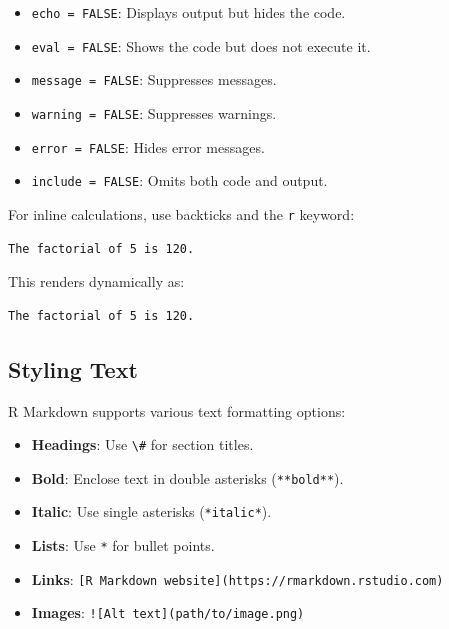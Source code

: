 \documentclass[
  11pt,
]{book}
\newcommand{\passthrough}[1]{#1}
\providecommand{\tightlist}{%
  \setlength{\itemsep}{0pt}\setlength{\parskip}{0pt}}
\theoremstyle{definition}
\theoremstyle{definition}
\theoremstyle{definition}
\theoremstyle{definition}
\theoremstyle{remark}
\begin{document}
\begin{itemize}
\tightlist
\item
  \passthrough{\lstinline!echo = FALSE!}: Displays output but hides the code.\\
\item
  \passthrough{\lstinline!eval = FALSE!}: Shows the code but does not execute it.\\
\item
  \passthrough{\lstinline!message = FALSE!}: Suppresses messages.\\
\item
  \passthrough{\lstinline!warning = FALSE!}: Suppresses warnings.\\
\item
  \passthrough{\lstinline!error = FALSE!}: Hides error messages.\\
\item
  \passthrough{\lstinline!include = FALSE!}: Omits both code and output.
\end{itemize}

For inline calculations, use backticks and the \passthrough{\lstinline!r!} keyword:

\begin{lstlisting}
The factorial of 5 is 120.
\end{lstlisting}

This renders dynamically as:

\begin{lstlisting}
The factorial of 5 is 120.
\end{lstlisting}

\subsection*{Styling Text}\label{styling-text}


R Markdown supports various text formatting options:

\begin{itemize}
\tightlist
\item
  \textbf{Headings}: Use \passthrough{\lstinline!\#!} for section titles.\\
\item
  \textbf{Bold}: Enclose text in double asterisks (\passthrough{\lstinline!**bold**!}).\\
\item
  \textbf{Italic}: Use single asterisks (\passthrough{\lstinline!*italic*!}).\\
\item
  \textbf{Lists}: Use \passthrough{\lstinline!*!} for bullet points.\\
\item
  \textbf{Links}: \passthrough{\lstinline![R Markdown website](https://rmarkdown.rstudio.com)!}\\
\item
  \textbf{Images}: \passthrough{\lstinline"![Alt text](path/to/image.png)"}
\end{itemize}
\end{document}
